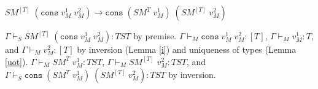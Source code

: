\begin{case}
$SM^{[T]}\;(\mathtt{cons}\;v_{M}^{1}\;v_{M}^{2})\rightarrow\mathtt{cons}\;(SM^{T}\;v_{M}^{1})\;(SM^{[T]}\;v_{M}^{2})$

$\Gamma\vdash_{S}SM^{[T]}\;(\mathtt{cons}\;v_{M}^{1}\;v_{M}^{2}):TST$ by premise.  $\Gamma\vdash_{M}\mathtt{cons}\;v_{M}^{1}\;v_{M}^{2}:[T]$, $\Gamma\vdash_{M}v_{M}^{1}:T$, and $\Gamma\vdash_{M}v_{M}^{2}:[T]$ by inversion (Lemma \ref{i}) and uniqueness of types (Lemma \ref{uot}).  $\Gamma\vdash_{M}SM^{T}\;v_{M}^{1}:TST$, $\Gamma\vdash_{M}SM^{[T]}\;v_{M}^{2}:TST$, and $\Gamma\vdash_{S}\mathtt{cons}\;(SM^{T}\;v_{M}^{1})\;(SM^{[T]}\;v_{M}^{2}):TST$ by inversion.
\end{case}